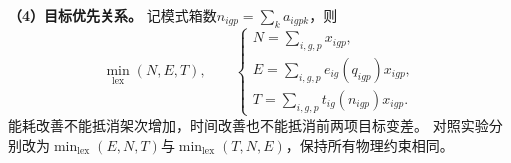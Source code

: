 \textbf{（4）目标优先关系。}
记模式箱数$n_{igp}=\sum_k a_{igpk}$，则
\begin{equation}
 \min_{\mathrm{lex}}(N,E,T),\qquad
 \begin{cases}
 N=\sum_{i,g,p}x_{igp},\\
 E=\sum_{i,g,p}e_{ig}(q_{igp})x_{igp},\\
 T=\sum_{i,g,p}t_{ig}(n_{igp})x_{igp}.
 \end{cases}
 \label{eq:q1:objective}
\end{equation}
能耗改善不能抵消架次增加，时间改善也不能抵消前两项目标变差。
对照实验分别改为$\min_{\mathrm{lex}}(E,N,T)$与$\min_{\mathrm{lex}}(T,N,E)$，保持所有物理约束相同。
